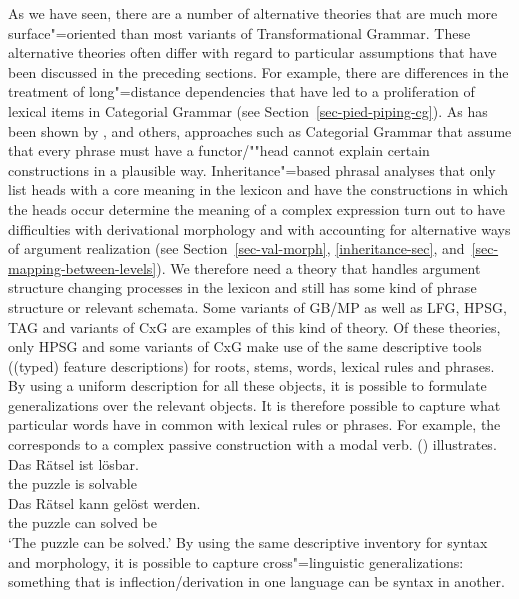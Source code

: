 As we have seen, there are a number of alternative theories that are much more surface"=oriented than
most variants of Transformational Grammar. These alternative theories often differ with
regard to particular assumptions that have been discussed in the preceding sections. For example, there are differences in the treatment of long"=distance dependencies that
have led to a proliferation of lexical items in Categorial Grammar (see Section~\ref{sec-pied-piping-cg}). As has been shown by \citet{Jacobs2008a}, \citet{Jackendoff2008a}
and others, approaches such as Categorial Grammar that assume that every phrase must have a functor/""head cannot explain certain constructions in a plausible way.
Inheritance"=based phrasal analyses that only list heads with a core meaning in the lexicon and have the constructions in which the heads occur determine the meaning
of a complex expression turn out to have difficulties with derivational morphology and with
accounting for alternative ways of argument realization (see Section~\ref{sec-val-morph},
\ref{inheritance-sec}, and~\ref{sec-mapping-between-levels}).
We therefore need a theory that handles argument structure changing processes in the lexicon and still has some kind of phrase structure or relevant schemata. Some variants
of GB/MP as well as LFG, HPSG, TAG and variants of CxG are examples of this kind of theory. Of these
theories, only HPSG and some variants of CxG make use of the same descriptive tools ((typed) feature
descriptions) for roots, stems, words, lexical rules and phrases. By using a uniform description for
all these objects, it is possible to formulate generalizations over the relevant objects. It is therefore
possible to capture what particular words have in common with lexical rules or phrases.
For example, the \bard{} corresponds to a complex passive construction with
a modal verb. () illustrates.
\eal
\ex 
\gll Das Rätsel ist lösbar.\\
     the puzzle is solvable\\
\ex 
\gll Das Rätsel kann gelöst werden.\\
     the puzzle can solved be\\
\glt `The puzzle can be solved.'
\zl
By using the same descriptive inventory for syntax and morphology, it is possible to capture
cross"=linguistic generalizations: something that is inflection/derivation in one language can be syntax in another.

